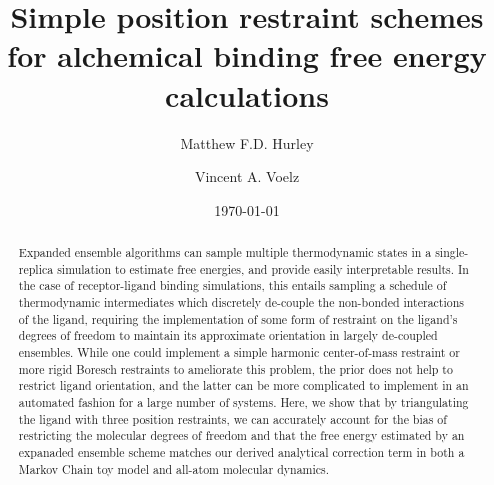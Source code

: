 \documentclass[%
 aip,
rsi,%
 amsmath,amssymb,
 reprint,%
]{revtex4-1}
\begin{document}

\title[Simple restraint schemes for binding free energies]{Simple position restraint schemes for alchemical binding free energy calculations}%




\author{Matthew F.D. Hurley}
\author{Vincent A. Voelz}


\date{\today}%

\begin{abstract}
Expanded ensemble algorithms can sample multiple thermodynamic states in a single-replica simulation to estimate free energies, and provide easily interpretable results.  In the case of receptor-ligand binding simulations, this entails sampling a schedule of thermodynamic intermediates which discretely de-couple the non-bonded interactions of the ligand, requiring the implementation of some form of restraint on the ligand's degrees of freedom to maintain its approximate orientation in largely de-coupled ensembles. While one could implement a simple harmonic center-of-mass restraint or more rigid Boresch restraints to ameliorate this problem, the prior does not help to restrict ligand orientation, and the latter can be more complicated to implement in an automated fashion for a large number of systems. Here, we show that by triangulating the ligand with three position restraints, we can accurately account for the bias of restricting the molecular degrees of freedom and that the free energy estimated by an expanaded ensemble scheme matches our derived analytical correction term in both a Markov Chain toy model and all-atom molecular dynamics.
\end{abstract}
\end{document}
